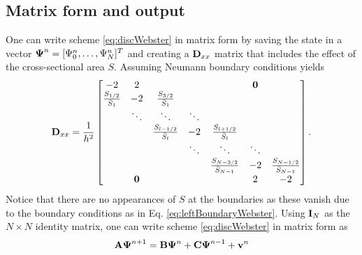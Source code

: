 
\subsection{Matrix form and output}\label{sec:outputWebster}
One can write scheme \eqref{eq:discWebster} in matrix form by saving the state in a vector $\boldsymbol{\Psi}^n = [\Psi_0^n, \hdots, \Psi_N^n]^T$ and creating a $\mathbf{D}_{xx}$ matrix that includes the effect of the cross-sectional area $S$. Assuming Neumann boundary conditions yields
\begin{equation}
    \mathbf{D}_{xx} = \frac{1}{h^2}\begin{bmatrix}
        -2& 2 &  & & & \mathbf{0}& \\
        \frac{S_{1/2}}{\bar{S}_1} & -2 &\frac{S_{3/2}}{\bar{S}_1} & & & & \\
        & \ddots & \ddots & \ddots &  & & \\
        & & \frac{S_{l-1/2}}{\bar{S}_l}& -2 & \frac{S_{l+1/2}}{\bar{S}_l} & & \\
        & & & \ddots & \ddots & \ddots & \\
        & & &  & \frac{S_{N-3/2}}{\bar{S}_{N-1}}  & -2 & \frac{S_{N-1/2}}{\bar{S}_{N-1}} \\
        & \mathbf{0} & & & & 2 & -2 \\
    \end{bmatrix}.
\end{equation}
Notice that there are no appearances of $S$ at the boundaries as these vanish due to the boundary conditions as in Eq. \eqref{eq:leftBoundaryWebster}.
Using $\mathbf{I}_N$ as the $N\times N$ identity matrix, one can write scheme \eqref{eq:discWebster} in matrix form as
\begin{equation}\label{eq:matrixFormWebsters}
    \mathbf{A}\boldsymbol{\Psi}^{n+1} = \mathbf{B}\boldsymbol{\Psi}^n + \mathbf{C} \boldsymbol{\Psi}^{n-1} + \mathbf{v}^n
\end{equation}
